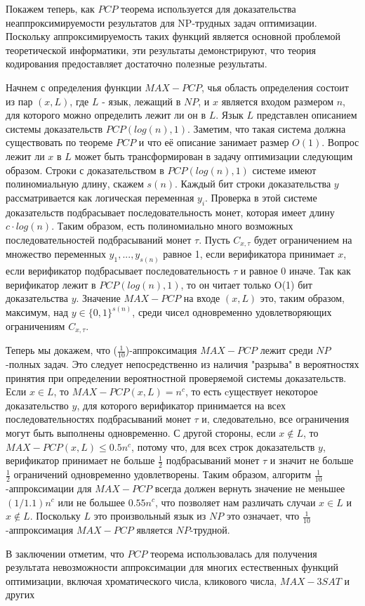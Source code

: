 \documentclass{article}
\newcommand{\blank} {
\newline
\newline
}
\theoremstyle{definition}
\begin{document}
\blank
Покажем теперь, как $PCP$ теорема используется для доказательства неаппроксимируемости результатов для NP-трудных задач оптимизации. Поскольку аппроксимируемость таких функций является основной проблемой теоретической информатики, эти результаты демонстрируют, что теория кодирования предоставляет достаточно полезные результаты.
\blank
Начнем с определения функции $MAX-PCP$, чья область определения состоит из пар $(x, L)$, где $L$ - язык, лежащий в $NP$, и $x$ является входом размером $n$, для которого можно определить лежит ли он в $L$. Язык $L$ представлен описанием системы доказательств $PCP(log(n), 1)$. Заметим, что такая система должна существовать по теореме $PCP$ и что её описание занимает размер $O(1)$. Вопрос лежит ли $x$ в $L$ может быть трансформирован  в задачу оптимизации следующим образом. Строки с доказательством в $PCP(log(n), 1)$ системе имеют полиномиальную длину, скажем $s(n)$. Каждый бит строки доказательства $y$ рассматривается как логическая переменная $y_i$. Проверка в этой системе доказательств подбрасывает последовательность монет, которая имеет длину $c \cdot log(n)$. Таким образом, есть полиномиально много возможных последовательностей подбрасываний монет $\tau$. Пусть $C_{x, \tau}$ будет ограничением на множество переменных $y_1,..., y_{s(n)}$ равное 1, если верификатора принимает $x$, если верификатор подбрасывает последовательность $\tau$ и равное 0 иначе. Так как верификатор лежит в $PCP(log(n) ,1)$, то он читает только O(1) бит доказательства $y$.  Значение $MAX-PCP$ на входе $(x, L)$ это, таким образом, максимум, над $y \in \{0, 1\}^{s(n)}$, среди чисел одновременно удовлетворяющих ограничениям $C_{x, \tau}$.
\blank
Теперь мы докажем, что ($\frac{1}{10}$)-аппроксимация $MAX-PCP$ лежит среди $NP$-полных задач. Это следует непосредственно из наличия "разрыва" в вероятностях принятия при определении вероятностной проверяемой системы доказательств. Если $x \in L$, то $MAX-PCP(x, L) = n^{c}$, то есть cуществует некоторое доказательство $y$, для которого верификатор принимается на всех последовательностях подбрасываний монет $\tau$ и, следовательно, все ограничения могут быть выполнены одновременно. С другой стороны, если $x \notin L$, то $MAX-PCP(x, L) \leq 0.5n^c$, потому что, для всех строк доказательств $y$, верификатор принимает не больше $\frac{1}{2}$ подбрасываний монет $\tau$ и значит не больше $\frac{1}{2}$ ограничений одновременно удовлетворены. Таким образом, алгоритм $\frac{1}{10}$-аппроксимации для $MAX-PCP$ всегда должен вернуть значение не меньшее $(1/1.1)n^c$ или не большее $0.55n^c$, что позволяет нам различать случаи $x \in L$ и $x \notin L$. Поскольку $L$ это произвольный язык из $NP$ это означает, что $\frac{1}{10}$-аппроксимация $MAX-PCP$ является $NP$-трудной.
\blank
В заключении отметим, что $PCP$ теорема использовалась для получения результата невозможности аппроксимации для многих естественных функций оптимизации, включая хроматического числа, кликового числа, $MAX-3SAT$ и других
\end{document}
